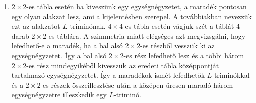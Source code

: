 \begin{solution}
\begin{enumerate}
	\item
$2\times 2$-es tábla esetén ha kiveszünk egy egységnégyzetet, a maradék pontosan egy olyan alakzat lesz, ami a kijelentésben szerepel. A továbbiakban nevezzük ezt az alakzatot $L$-triminónak. $4\times 4$-es tábla esetén vágjuk szét a táblát $4$ darab $2\times 2$-es táblára. A szimmetria miatt elégséges azt megvizsgálni, hogy lefedhető-e a maradék, ha a bal alsó $2\times 2$-es részből vesszük ki az egységnégyzetet. Így a bal alsó $2\times 2$-es rész lefedhető lesz és a többi három $2\times 2$-es rész mindegyikéből kivesszük az eredeti tábla középpontját tartalmazó egységnégyzetet. Így a maradékok ismét lefedhetők $L$-triminókkal és a $2\times 2$-es részek összeillesztése után a középen üresen maradó három egységnégyzetre illeszkedik egy $L$-triminó.


\end{enumerate}
\end{solution}

